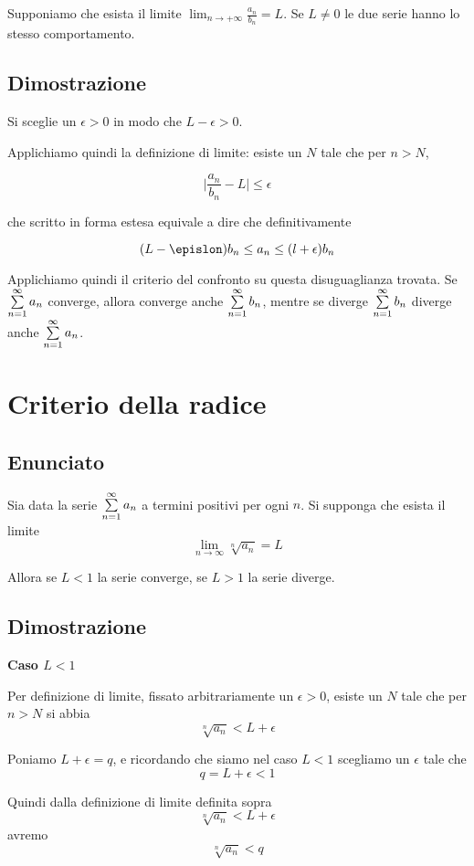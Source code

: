 Supponiamo che esista il limite $\lim_{n\to +\infty}\frac{a_n}{b_n}=L$. Se $L \neq 0$ le due serie hanno lo stesso comportamento.

\subsection{Dimostrazione}

Si sceglie un $\epsilon>0$ in modo che $L-\epsilon>0$. 

Applichiamo quindi la definizione di limite: esiste un $N$ tale che per $n > N$, 

$$\lvert \frac{a_n}{b_n} - L\rvert \leq \epsilon$$

che scritto in forma estesa equivale a dire che definitivamente

$$(L-\epislon)b_n\leq a_n \leq (l+\epsilon)b_n$$

Applichiamo quindi il criterio del confronto su questa disuguaglianza trovata. Se $\sum\limits_{n=1}^{\infty} a_n$ converge, allora converge anche $\sum\limits_{n=1}^{\infty} b_n$, mentre se diverge $\sum\limits_{n=1}^{\infty} b_n$ diverge anche $\sum\limits_{n=1}^{\infty} a_n$.

\section{Criterio della radice}
\subsection{Enunciato}

Sia data la serie $\sum\limits_{n=1}^{\infty} a_n$ a termini positivi per ogni $n$. Si supponga che esista il limite $$\lim_{n \to \infty} \sqrt[n]{a_n} = L$$

Allora se $L<1$ la serie converge, se $L>1$ la serie diverge.


\subsection{Dimostrazione}

\textbf{Caso $L<1$}

Per definizione di limite, fissato arbitrariamente un $\epsilon>0$, esiste un $N$ tale che per $n>N$ si abbia $$\sqrt[n]{a_n} < L+\epsilon$$


Poniamo $L+\epsilon = q$, e ricordando che siamo nel caso $L<1$ scegliamo un $\epsilon$ tale che $$q = L+\epsilon < 1$$

Quindi dalla definizione di limite definita sopra $$\sqrt[n]{a_n} < L+\epsilon$$ avremo $$\sqrt[n]{a_n} < q$$

